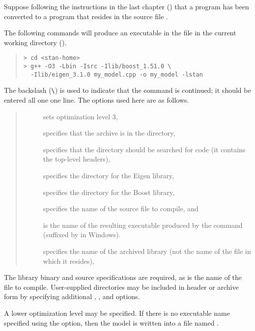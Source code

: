 Suppose following the instructions in the last chapter
() that a \Stan program has been converted to a \Cpp
program that resides in the source file .

The following commands will produce an executable in the file
 in the current working directory ().
%
\begin{quote}
\begin{Verbatim}[fontshape=sl]
> cd <stan-home>
> g++ -O3 -Lbin -Isrc -Ilib/boost_1.51.0 \
  -Ilib/eigen_3.1.0 my_model.cpp -o my_model -lstan
\end{Verbatim}
\end{quote} %
The backslash (\Verb|\|) is used to indicate that the command is
continued; it should be entered all one one line.
%
The options used here are as follows.
\begin{quote}
\begin{description}
\item[] sets optimization level 3,
\item[] specifies that the archive is in the 
  directory,
\item[] specifies that the directory  should be
  searched for code (it contains the top-level \Stan headers),
\item[] specifies the directory for
  the Eigen library,
\item[] specifies the directory for the 
  Boost library,
\item[] specifies the name of the source file to
  compile, and 
\item[] is the name of the resulting executable
  produced by the command (suffixed by \code{.exe} in Windows).
\item[] specifies the name of the archived library (not
  the name of the file in which it resides),
\end{description}
\end{quote}
%
The library binary and source specifications are required, as is the
name of the \Cpp file to compile.  User-supplied directories may be
included in header or archive form by specifying additional ,
\code{-l}, and \code{-I} options.
 
A lower optimization level may be specified.  If there is no
executable name specified using the  option, then the model
is written into a file named \code{a.out}.
 

